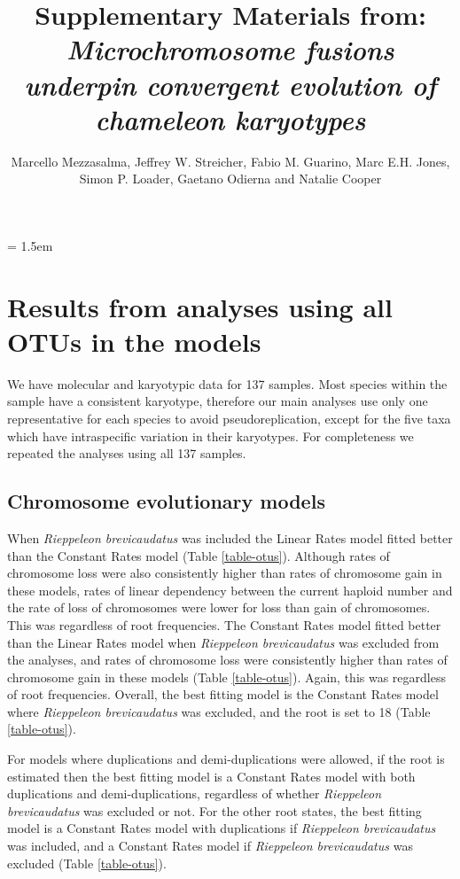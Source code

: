 \documentclass[a4paper, 12pt]{article}
\title{Supplementary Materials from: \textit{Microchromosome fusions underpin convergent evolution of chameleon karyotypes}}
\author{Marcello Mezzasalma, Jeffrey W. Streicher, Fabio M. Guarino, Marc E.H. Jones,\\ 
Simon P. Loader, Gaetano Odierna and Natalie Cooper}
\author{}
\begin{document}
\maketitle

\tableofcontents

\parindent = 1.5em
\addtolength{\parskip}{.3em}

\newpage
\section{Results from analyses using all OTUs in the models}

We have molecular and karyotypic data for 137 samples. Most species within the sample have a consistent karyotype, therefore our main analyses use only one representative for each species to avoid pseudoreplication, except for the five taxa which have intraspecific variation in their karyotypes. For completeness we repeated the analyses using all 137 samples.

\subsection{Chromosome evolutionary models}
When \textit{Rieppeleon brevicaudatus} was included the Linear Rates model fitted better than the Constant Rates model (Table \ref{table-otus}). Although rates of chromosome loss were also consistently higher than rates of chromosome gain in these models, rates of linear dependency between the current haploid number and the rate of loss of chromosomes were lower for loss than gain of chromosomes. This was regardless of root frequencies. The Constant Rates model fitted better than the Linear Rates model when \textit{Rieppeleon brevicaudatus} was excluded from the analyses, and rates of chromosome loss were consistently higher than rates of chromosome gain in these models (Table \ref{table-otus}). Again, this was regardless of root frequencies. Overall, the best fitting model is the Constant Rates model where \textit{Rieppeleon brevicaudatus} was excluded, and the root is set to 18 (Table \ref{table-otus}). 

\noindent For models where duplications and demi-duplications were allowed, if the root is estimated then the best fitting model is a Constant Rates model with both duplications and demi-duplications, regardless of whether \textit{Rieppeleon brevicaudatus} was excluded or not. For the other root states, the best fitting model is a Constant Rates model with duplications if \textit{Rieppeleon brevicaudatus} was included, and a Constant Rates model if \textit{Rieppeleon brevicaudatus} was excluded (Table \ref{table-otus}). 
\end{document}
